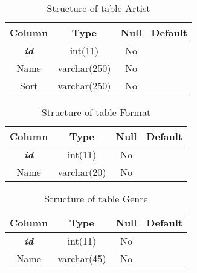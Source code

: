 %
%
\begin{longtable}{|c|c|c|c|} 
\caption{Structure of table Artist} 
\label{tab:Artist-structure} \\
\hline 
\multicolumn{1}{|c|}{\textbf{Column}} & \multicolumn{1}{|c|}{\textbf{Type}} & \multicolumn{1}{|c|}{\textbf{Null}} & \multicolumn{1}{|c|}{\textbf{Default}} \\ 
\hline
\textbf{\textit{id}} & int(11) & No &  \\ 
\hline 
Name & varchar(250) & No &  \\ 
\hline 
Sort & varchar(250) & No &  \\ 
\hline 
\end{longtable}

%
%
\begin{longtable}{|c|c|c|c|} 
\caption{Structure of table Format} 
\label{tab:Format-structure} \\
\hline 
\multicolumn{1}{|c|}{\textbf{Column}} & \multicolumn{1}{|c|}{\textbf{Type}} & \multicolumn{1}{|c|}{\textbf{Null}} & \multicolumn{1}{|c|}{\textbf{Default}} \\ 
\hline
\textbf{\textit{id}} & int(11) & No &  \\ 
\hline 
Name & varchar(20) & No &  \\ 
\hline 
\end{longtable}

%
%
\begin{longtable}{|c|c|c|c|} 
\caption{Structure of table Genre} 
\label{tab:Genre-structure} \\
\hline 
\multicolumn{1}{|c|}{\textbf{Column}} & \multicolumn{1}{|c|}{\textbf{Type}} & \multicolumn{1}{|c|}{\textbf{Null}} & \multicolumn{1}{|c|}{\textbf{Default}} \\ 
\hline
\textbf{\textit{id}} & int(11) & No &  \\ 
\hline 
Name & varchar(45) & No &  \\ 
\hline 
\end{longtable}

%
%

